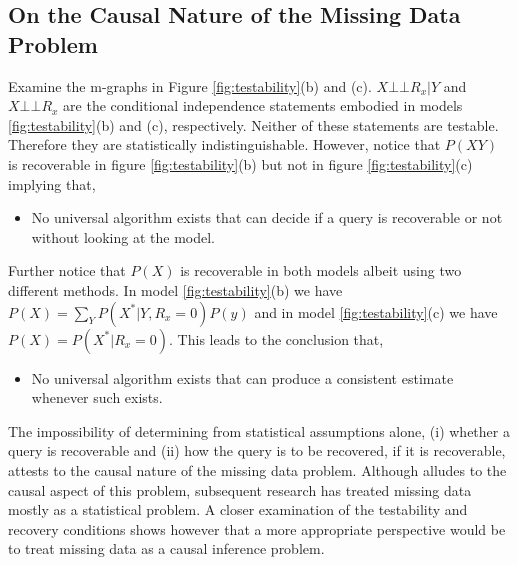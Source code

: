\documentclass[12pt]{article}
\newcommand{\compos}{\mbox{$\bot\!\!\!\bot$}}
\begin{document}
\subsection{On the Causal Nature of the Missing Data Problem}
Examine the m-graphs in Figure \ref{fig:testability}(b) and (c).  $X \compos R_x|Y$ and $X \compos R_x$ are the conditional independence statements embodied in models \ref{fig:testability}(b) and (c), respectively. Neither of these statements are testable. Therefore they are statistically indistinguishable. However, notice that $P(XY)$ is recoverable in figure  \ref{fig:testability}(b) but not in  figure \ref{fig:testability}(c) implying that,
\begin{itemize}
	\item No universal algorithm exists that can decide if a query is recoverable or not without looking at the model. 
\end{itemize}
Further notice that $P(X)$ is recoverable in both models albeit using two different methods. 	In model \ref{fig:testability}(b) we have $P(X)=\sum_YP(X^*|Y,R_x=0)P(y)$ and in model \ref{fig:testability}(c) we have
	$P(X)=P(X^*|R_x=0)$. This leads to the conclusion that, 
	\begin{itemize}
		\item 	No universal algorithm exists that can produce a consistent estimate whenever such exists.	 
	\end{itemize}
The impossibility of determining from statistical assumptions alone, (i) whether a query is recoverable and (ii) how the query is to be recovered, if it is recoverable, attests to the causal nature of the missing data problem. Although \cite{Rubin_missing} alludes to the causal aspect of this problem, subsequent research has treated missing data mostly as a statistical problem. A closer examination of the testability and recovery conditions
shows however that a more appropriate perspective would be to treat
missing data as a causal inference problem.
\end{document}

